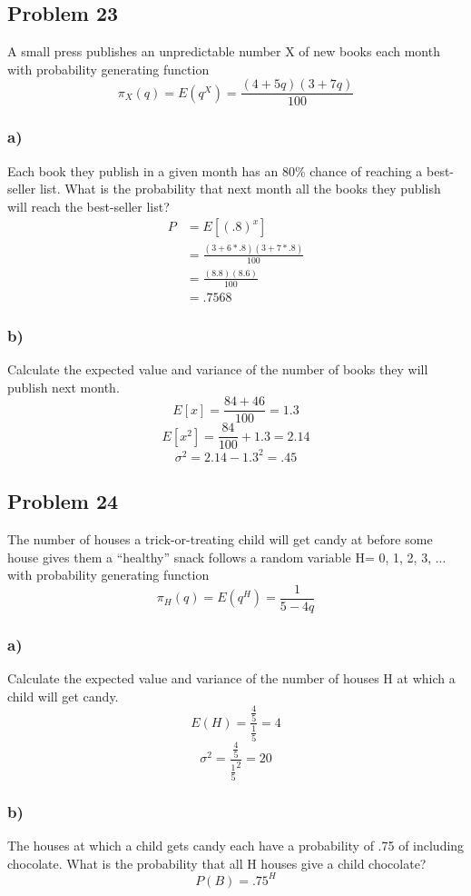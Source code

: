 \documentclass{article}
\begin{document}
\subsection*{Problem 23}
A  small  press  publishes  an  unpredictable  number X of new books  each  month  with probability generating function
\begin{equation}
    \pi_X(q) = E(q^X)=\frac{(4+5q)(3+7q)}{100}
\end{equation}
\subsubsection*{a)}
Each book they publish in a given month has an 80\% chance of reaching a best-seller list. What is the probability that next month all the books they publish will reach the best-seller list? 
\begin{align}
    P &= E[(.8)^x]\\
    &= \frac{(3+6*.8)(3+7*.8)}{100}\\
    &= \frac{(8.8)(8.6)}{100}\\
    &= .7568
\end{align}
\subsubsection*{b)}
Calculate the expected value and variance of the number of books they will publish next month.
\begin{equation}
    E[x] = \frac{84+46}{100} = 1.3
\end{equation}
\begin{equation}
    E[x^2] = \frac{84}{100} + 1.3 = 2.14
\end{equation}
\begin{equation}
    \sigma^2 = 2.14 - 1.3^2  = .45
\end{equation}
\newpage
\subsection*{Problem 24}
The number of houses a trick-or-treating child will get candy at before some house gives them a “healthy” snack follows a random variable H= {0, 1, 2, 3, ...} with probability generating function
\begin{equation}
    \pi_H(q)=E(q^H)=\frac{1}{5-4q}
\end{equation}
\subsubsection*{a)}
Calculate the expected value and variance of the number of houses H at which a child will get candy.
\begin{equation}
    E(H) = \frac{\frac{4}{5}}{\frac{1}{5}}=4
\end{equation}
\begin{equation}
    \sigma^2 = \frac{\frac{4}{5}}{\frac{1}{5}^2} = 20
\end{equation}
\subsubsection*{b)}
The houses at which a child gets candy each have a probability of .75 of including chocolate. What is the probability that all H houses give a child chocolate?
\begin{equation}
    P(B) = .75^H
\end{equation}
\end{document}

